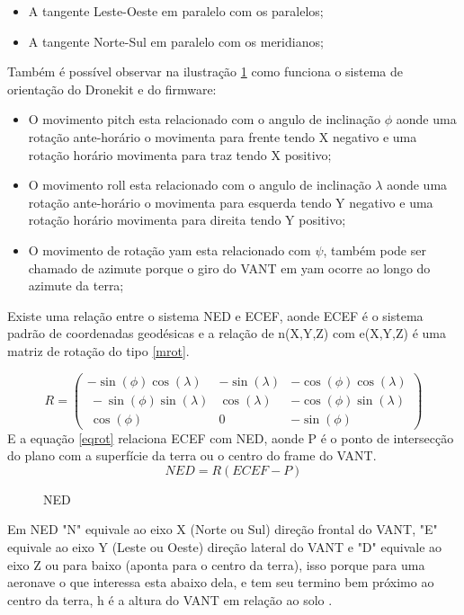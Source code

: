 \begin{itemize}
	\item A tangente Leste-Oeste em paralelo com os paralelos;
	\item A tangente Norte-Sul em paralelo com os meridianos;
\end{itemize}

Também é possível observar na ilustração \ref{fig:ned} como funciona o sistema de orientação do Dronekit e do firmware:

 \begin{itemize}
 	\item O movimento pitch esta relacionado com o angulo de inclinação $\phi$ aonde uma rotação ante-horário o movimenta para frente tendo X negativo e uma rotação horário movimenta para traz tendo X positivo;
 	\item O movimento roll esta relacionado com o angulo de inclinação $\lambda$ aonde uma rotação ante-horário o movimenta para esquerda tendo Y negativo e uma rotação horário movimenta para direita tendo Y positivo;
 	\item O movimento de rotação yam esta relacionado com $\psi$, também pode ser chamado de azimute porque o giro do VANT em yam ocorre ao longo do azimute da terra;
  \end{itemize}	

 Existe uma relação entre o sistema NED e ECEF, aonde ECEF é o sistema padrão de coordenadas geodésicas e a relação de n(X,Y,Z) com e(X,Y,Z) é uma matriz de rotação do tipo \ref{mrot}.
 
 \begin{equation}
	R=\begin{pmatrix}-\sin \left(\phi \right)\cos \left(\lambda \right)&-\sin \left(\lambda \right)&-\cos \left(\phi \right)\cos \left(\lambda \right)\\ \:-\sin \left(\phi \right)\sin \left(\lambda \right)&\cos \left(\lambda \right)&-\cos \left(\phi \right)\sin \left(\lambda \right)\\ \:\cos \left(\phi \right)&0&-\sin \left(\phi \right)\end{pmatrix}
 	\label{mrot}
 \end{equation}
E a equação \ref{eqrot} relaciona ECEF com NED, aonde P é o ponto de intersecção do plano com a superfície da terra ou o centro do frame do VANT.
 \begin{equation}
 	\label{eqrot}
	NED=R\left(ECEF-P\right)
 \end{equation}
\begin{figure}[H]
	\centering
	\caption{NED}
	
	\label{fig:ned}
\end{figure}

Em NED "N" equivale ao eixo X (Norte ou Sul) direção frontal do VANT, "E" equivale ao eixo Y (Leste ou Oeste) direção lateral do VANT e "D" equivale ao eixo Z ou para baixo (aponta para o centro da terra), isso porque para uma aeronave o que interessa esta abaixo dela, e tem seu termino bem próximo ao centro da terra, h é a altura do VANT em relação ao solo \cite{article1}. 